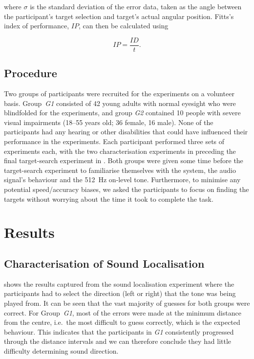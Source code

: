 \documentclass[acmsmall]{acmart}
\begin{document}
\noindent
where $\sigma$ is the standard deviation of the error data, taken as the angle between the participant's target selection and target's actual angular position.
Fitts's index of performance, $IP$, can then be calculated using 

\begin{equation}
  \label{eq:fitts-performance}
  IP = \frac{ID}{t}.
\end{equation}

\subsection{Procedure}

Two groups of participants were recruited for the experiments on a volunteer basis. 
Group~\textit{G1} consisted of 42 young adults with normal eyesight who were blindfolded for the experiments, and group \textit{G2} contained 10 people with severe visual impairments (18--55 years old; 36 female, 16 male). 
None of the participants had any hearing or other disabilities that could have influenced their performance in the experiments.
Each participant performed three sets of experiments each, with the two characterisation experiments in  preceding the final target-search experiment in . 
Both groups were given some time before the target-search experiment to familiarise themselves with the system, the audio signal's behaviour and the \SI{512}{\hertz} on-level tone. 
Furthermore, to minimise any potential speed/accuracy biases, we asked the participants to focus on finding the targets without worrying about the time it took to complete the task. 

\section{Results}\label{sec:results}

\subsection{Characterisation of Sound Localisation}

 shows the results captured from the sound localisation experiment where the participants had to select the direction (left or right) that the tone was being played from. 
It can be seen that the vast majority of guesses for both groups were correct.
For Group~\textit{G1}, most of the errors were made at the minimum distance from the centre, i.e.\ the most difficult to guess correctly, which is the expected behaviour.
This indicates that the participants in \textit{G1} consistently progressed through the distance intervals and we can therefore conclude they had little difficulty determining sound direction.
\end{document}
